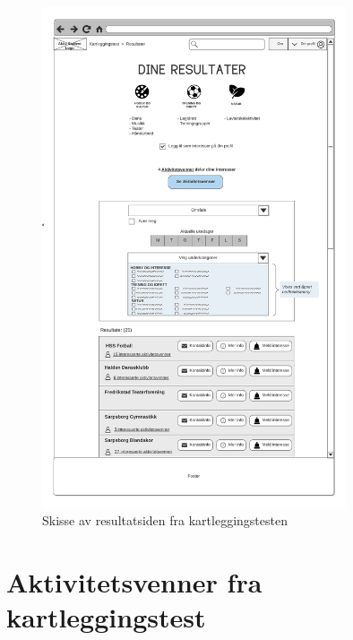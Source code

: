 \begin{figure}[H]
\centering
\includegraphics[width=0.8\textwidth]{Illustrasjoner/Skisser/2.0/2-13-kartleggingstest-resultat.png}
\caption{Skisse av resultatsiden fra kartleggingstesten}
\label{vedlegg:2-13-kartlegging-res}
\end{figure}

\section{Aktivitetsvenner fra kartleggingstest}

